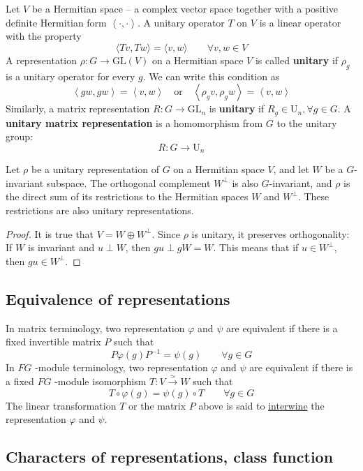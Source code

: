 Let $V$ be a Hermitian space -- a complex vector space together with a positive definite Hermitian form $\left< \cdot,\cdot \right>$. A unitary operator $T$ on $V$ is a linear operator with the property
\[
\langle T v, T w\rangle=\langle v, w\rangle\qquad \forall v,w\in V
\]
A representation $\rho:G\to \mathrm{GL}(V)$ on a Hermitian space $V$ is called \textbf{unitary} if $\rho_{g}$ is a unitary operator for every $g$. We can write this condition as
\[
\left< gw,gw \right> = \left< v,w \right> \quad \text{or}\quad \left< \rho_{g}v,\rho_{g}w \right> = \left< v,w \right>
\]
Similarly, a matrix representation $R:G\to \mathrm{GL}_n$ is \textbf{unitary} if $R_{g}\in \mathrm{U}_n,\forall g\in G$. A \textbf{unitary matrix representation} is a homomorphism from $G$ to the unitary group:
\[
R:G\to \mathrm{U}_n
\]
\begin{lemma}
Let $\rho$ be a unitary representation of $G$ on a Hermitian space $V$, and let $W$ be a $G$-invariant subspace. The orthogonal complement $W^{\perp}$ is also $G$-invariant, and $\rho$ is the direct sum of its restrictions to the Hermitian spaces $W$ and $W^{\perp}$. These restrictions are also unitary representations.
\end{lemma}
\begin{proof}
It is true that $V=W \oplus W^{\perp}$. Since $\rho$ is unitary, it preserves orthogonality: If $W$ is invariant and $u \perp W$, then $g u \perp g W=W$. This means that if $u \in W^{\perp}$, then $g u \in W^{\perp}$.
\end{proof}

\subsection{Equivalence of representations}

In matrix terminology, two representation $\varphi$ and $\psi$ are equivalent if there is a fixed invertible matrix $P$ such that
\[
P\varphi(g)P^{-1}=\psi(g)\qquad \forall g\in G
\]
In $FG$ -module terminology, two representation $\varphi$ and $\psi$ are equivalent if there is a fixed $FG$ -module isomorphism $T:V\overset{ \simeq }{ \to }W$ such that
\[
T\circ \varphi(g)=\psi(g)\circ T\qquad \forall g\in G
\]
The linear transformation $T$ or the matrix $P$ above is said to \underline{interwine} the representation $\varphi$ and $\psi$.

\subsection{Characters of representations, class function}

